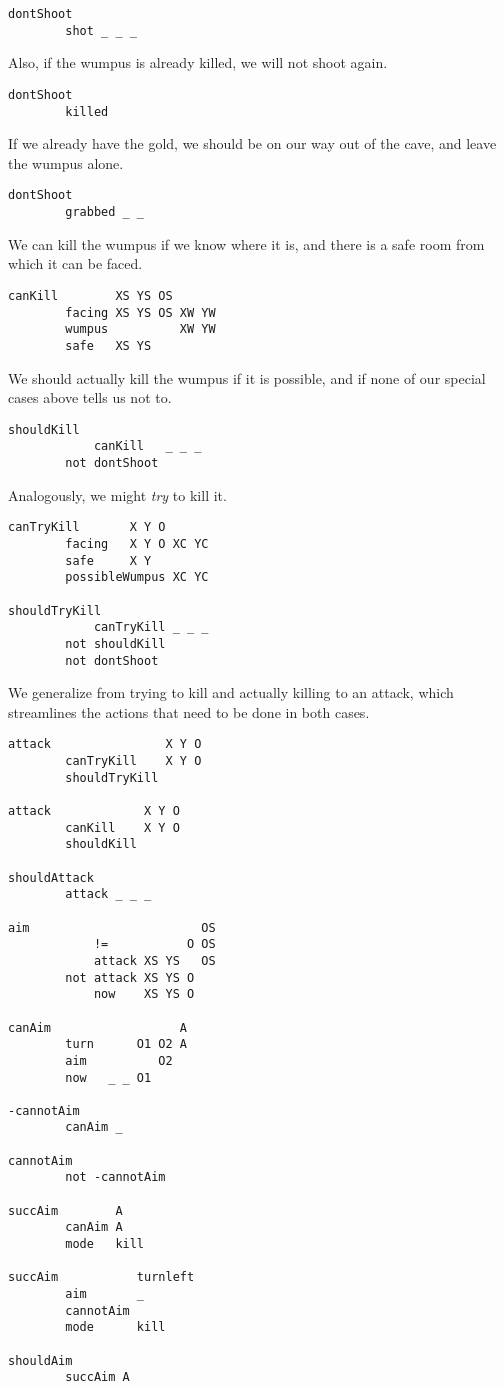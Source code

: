 \begin{verbatim}
dontShoot
        shot _ _ _
\end{verbatim}

Also, if the wumpus is already killed, we will not shoot again.

\begin{verbatim}
dontShoot
        killed
\end{verbatim}

If we already have the gold, we should be on our way out of the cave,
and leave the wumpus alone.

\begin{verbatim}
dontShoot
        grabbed _ _
\end{verbatim}

We can kill the wumpus if we know where it is, and there is a safe room
from which it can be faced.

\begin{verbatim}
canKill        XS YS OS
        facing XS YS OS XW YW
        wumpus          XW YW
        safe   XS YS
\end{verbatim}

We should actually kill the wumpus if it is possible, and if none of our
special cases above tells us not to.

\begin{verbatim}
shouldKill
            canKill   _ _ _
        not dontShoot
\end{verbatim}

Analogously, we might \emph{try} to kill it.

\begin{verbatim}
canTryKill       X Y O
        facing   X Y O XC YC
        safe     X Y
        possibleWumpus XC YC

shouldTryKill
            canTryKill _ _ _
        not shouldKill
        not dontShoot
\end{verbatim}

We generalize from trying to kill and actually killing to an attack,
which streamlines the actions that need to be done in both cases.

\begin{verbatim}
attack                X Y O
        canTryKill    X Y O
        shouldTryKill

attack             X Y O
        canKill    X Y O
        shouldKill

shouldAttack
        attack _ _ _

aim                        OS
            !=           O OS
            attack XS YS   OS
        not attack XS YS O
            now    XS YS O

canAim                  A
        turn      O1 O2 A
        aim          O2
        now   _ _ O1

-cannotAim
        canAim _

cannotAim
        not -cannotAim

succAim        A
        canAim A
        mode   kill

succAim           turnleft
        aim       _
        cannotAim
        mode      kill

shouldAim
        succAim A
\end{verbatim}

